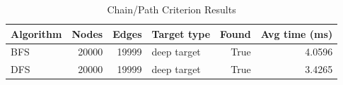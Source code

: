 \begin{table}[H]
\centering
\caption{Chain/Path Criterion Results}
\begin{tabular}{lrrlrr}
\toprule
Algorithm & Nodes & Edges & Target type & Found & Avg time (ms)\\
\midrule
BFS & 20000 & 19999 & deep target & True & 4.0596\\
DFS & 20000 & 19999 & deep target & True & 3.4265\\
\bottomrule
\end{tabular}
\end{table}
